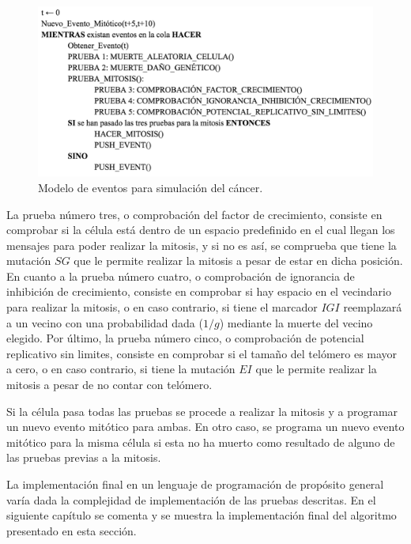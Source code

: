 \begin{figure}[h]
\centering
\includegraphics[scale=0.8]{figures/pseudo_alg}
\caption{Modelo de eventos para simulación del cáncer.}
\end{figure}

La prueba número tres, o comprobación del factor de crecimiento, consiste en comprobar
si la célula está dentro de un espacio predefinido en el cual llegan los mensajes
para poder realizar la mitosis, y si no es así, se comprueba que tiene la mutación $SG$
que le permite realizar la mitosis a pesar de estar en dicha posición. En cuanto a la prueba
número cuatro, o comprobación de ignorancia de inhibición de crecimiento, consiste en comprobar
si hay espacio en el vecindario para realizar la mitosis, o en caso contrario, si tiene el marcador
$IGI$ reemplazará a un vecino con una probabilidad dada ($1/g$) mediante la muerte del vecino elegido.
Por último, la prueba número cinco, o comprobación de potencial replicativo sin limites,
consiste en comprobar si el tamaño del telómero es mayor a cero, o en caso contrario,
si tiene la mutación $EI$ que le permite realizar la mitosis a pesar de no contar con telómero.

Si la célula pasa todas las pruebas se procede a realizar la mitosis y a programar un nuevo evento mitótico para ambas.
En otro caso, se programa un nuevo evento mitótico para la misma célula si esta no ha muerto como
resultado de alguno de las pruebas previas a la mitosis.

La implementación final en un lenguaje de programación de propósito general varía dada
la complejidad de implementación de las pruebas descritas. En el siguiente capítulo se comenta y se muestra
la implementación final del algoritmo presentado en esta sección.
